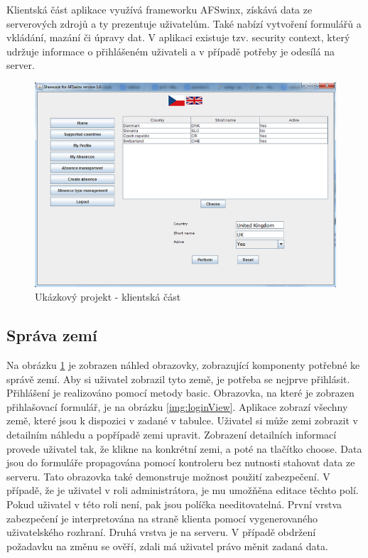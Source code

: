 Klientská část aplikace využívá frameworku AFSwinx, získává data ze serverových zdrojů a ty prezentuje uživatelům. Také nabízí vytvoření formulářů a vkládání, mazání či úpravy dat. V aplikaci existuje tzv. security context, který udržuje informace o přihlášeném uživateli a v případě potřeby je odesílá na server. 

\begin{figure}[h!]
\includegraphics[width=\linewidth]{images/Country}
\caption{Ukázkový projekt - klientská část}  
\label{img:country}
\end{figure}

\subsection{Správa zemí}
Na obrázku \ref{img:country} je zobrazen náhled obrazovky, zobrazující komponenty potřebné ke správě zemí. Aby si uživatel zobrazil tyto země, je potřeba se nejprve přihlásit. Přihlášení je realizováno pomocí metody basic. Obrazovka, na které je zobrazen přihlašovací formulář, je na obrázku \ref{img:loginView}. Aplikace zobrazí všechny země, které jsou k dispozici v zadané v tabulce. Uživatel si může zemi zobrazit v detailním náhledu a popřípadě zemi upravit. Zobrazení detailních informací provede uživatel tak, že klikne na konkrétní zemi, a poté na tlačítko choose. Data jsou do formuláře propagována pomocí kontroleru bez nutnosti stahovat data ze serveru. Tato obrazovka také demonstruje možnost použití zabezpečení. V případě, že je uživatel v roli administrátora, je mu umožňěna editace těchto polí. Pokud uživatel v této roli není, pak jsou políčka needitovatelná. První vrstva zabezpečení je interpretována na straně klienta pomocí vygenerovaného uživatelského rozhraní. Druhá vrstva je na serveru. V případě obdržení požadavku na změnu se ověří, zdali má uživatel právo měnit zadaná data.
